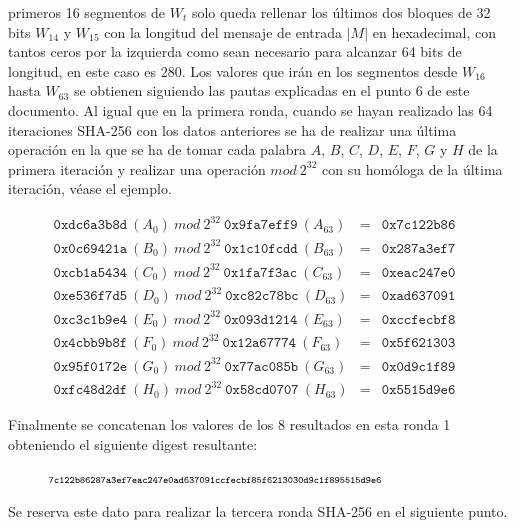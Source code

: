 \documentclass{article}
\begin{document}
        \noindent primeros 16 segmentos de $W_{t}$ solo queda rellenar los últimos dos bloques de 32 bits $W_{14}$ y $W_{15}$ con la longitud del mensaje de entrada $|M|$ en hexadecimal, con tantos ceros por la izquierda como sean necesario para alcanzar 64 bits de longitud, en este caso es $280$. Los valores que irán en los segmentos desde $W_{16}$ hasta $W_{63}$ se obtienen siguiendo las pautas explicadas en el punto 6 de este documento. Al igual que en la primera ronda, cuando se hayan realizado las 64 iteraciones SHA-256 con los datos anteriores se ha de realizar una última operación en la que se ha de tomar cada palabra $A$, $B$, $C$, $D$, $E$, $F$, $G$ y $H$ de la primera iteración y realizar  una operación $mod\ 2^{32}$ con su homóloga de la última iteración, véase el ejemplo.
        
        \begin{figure}[H]
        \centering
            $\begin{array}{lll}
                \texttt{0xdc6a3b8d}\ (A_0)\ mod\ 2^{32}\ \texttt{0x9fa7eff9}\ (A_63) & = & \texttt{0x7c122b86} \\
                \texttt{0x0c69421a}\ (B_0)\ mod\ 2^{32}\ \texttt{0x1c10fcdd}\ (B_63) & = & \texttt{0x287a3ef7} \\
                \texttt{0xcb1a5434}\ (C_0)\ mod\ 2^{32}\ \texttt{0x1fa7f3ac}\ (C_63) & = & \texttt{0xeac247e0} \\
                \texttt{0xe536f7d5}\ (D_0)\ mod\ 2^{32}\ \texttt{0xc82c78bc}\ (D_63) & = & \texttt{0xad637091} \\
                \texttt{0xc3c1b9e4}\ (E_0)\ mod\ 2^{32}\ \texttt{0x093d1214}\ (E_63) & = & \texttt{0xccfecbf8} \\
                \texttt{0x4cbb9b8f}\ (F_0)\ mod\ 2^{32}\ \texttt{0x12a67774}\ (F_63) & = & \texttt{0x5f621303} \\
                \texttt{0x95f0172e}\ (G_0)\ mod\ 2^{32}\ \texttt{0x77ac085b}\ (G_63) & = & \texttt{0x0d9c1f89} \\
                \texttt{0xfc48d2df}\ (H_0)\ mod\ 2^{32}\ \texttt{0x58cd0707}\ (H_63) & = & \texttt{0x5515d9e6}
            \end{array}$
        \end{figure}
        
        Finalmente se concatenan los valores de los 8 resultados en esta ronda 1 obteniendo el siguiente digest resultante:
        
        \begin{figure}[H]
        \centering
            $\scriptsize{\texttt{7c122b86287a3ef7eac247e0ad637091ccfecbf85f6213030d9c1f895515d9e6}}$
        \end{figure}
        Se reserva este dato para realizar la tercera ronda SHA-256 en el siguiente punto.
        
\end{document}
